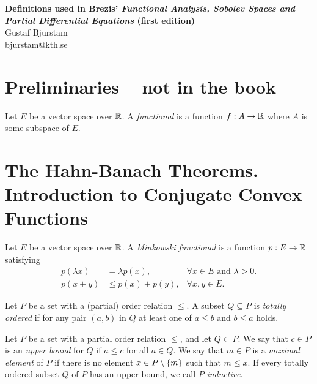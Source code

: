 \documentclass[12pt]{article}
\begin{document}
\begin{center}
\textbf{\large Definitions used in Brezis' \textit{Functional Analysis, Sobolev Spaces and Partial Differential Equations} (first edition)} \\
Gustaf Bjurstam\\
bjurstam@kth.se\\
\end{center}
\section*{Preliminaries -- not in the book}
\begin{definition}
    Let $E$ be a vector space over $\mathbb{R}$. A \textit{functional} is a function $f:A\to\mathbb{R}$ where $A$ is some subspace of $E$.
\end{definition}

\section{The Hahn-Banach Theorems. Introduction to Conjugate Convex Functions}
\begin{definition}
    Let $E$ be a vector space over $\mathbb{R}$. A \textit{Minkowski functional} is a function $p:E\to\mathbb{R}$ satisfying
    \begin{align}
        p(\lambda x) &= \lambda p(x), &\forall x\in E \text{ and } \lambda > 0.\\
        p(x+y) &\leq p(x)+p(y), &\forall x,y\in E.
    \end{align}
\end{definition}

\begin{definition}
    Let $P$ be a set with a (partial) order relation $\leq$. A subset $Q\subseteq P$ is \textit{totally ordered} if for any pair $(a,b)$ in $Q$ at least one of $a\leq b$ and $b\leq a$ holds. 
\end{definition}

\begin{definition}
    Let $P$ be a set with a partial order relation $\leq$, and let $Q\subset P$. We say that $c\in P$ is an \textit{upper bound} for $Q$ if $a\leq c$ for all $a\in Q$. We say that $m\in P$ is a \textit{maximal element} of $P$ if there is no element $x\in P\setminus\left\{m\right\}$ such that $m\leq x$. If every totally ordered subset $Q$ of $P$ has an upper bound, we call $P$ \textit{inductive}.
\end{definition}
\end{document}
